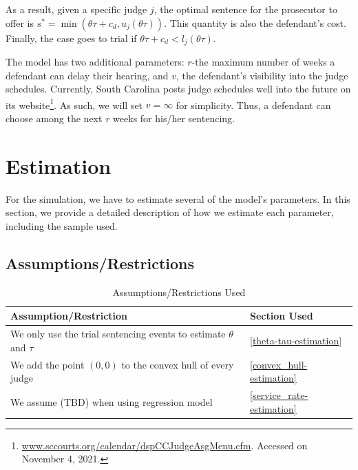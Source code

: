 \documentclass[11pt, oneside]{article}   	%
\theoremstyle{ModifiedStyle}
\begin{document}
  As a result, given a specific judge $j$, the optimal sentence for the prosecutor to offer is $s^* = \min(\theta \tau + c_d,u_j(\theta \tau))$. This quantity is also the defendant's cost. Finally, the case goes to trial if $\theta \tau + c_d < l_j(\theta \tau)$.

	The model has two additional parameters: $r$-the maximum number of weeks a defendant can delay their hearing, and $v$, the defendant's visibility into the judge schedules. Currently, South Carolina posts judge schedules well into the future on its website\footnote{\url{www.sccourts.org/calendar/dspCCJudgeAsgMenu.cfm}. Accessed on November 4, 2021.}. As such, we will set $v=\infty$ for simplicity. Thus, a defendant can choose among the next $r$ weeks for his/her sentencing.

\section{Estimation}
  For the simulation, we have to estimate several of the model's parameters. In this section, we provide a detailed description of how we estimate each parameter, including the sample used.

  \subsection{Assumptions/Restrictions}
    \begin{table}[H]
      \centering
      \caption{Assumptions/Restrictions Used}
      \label{tab:assumptions}
      \begin{tabular}{ll}
      \hline
      \textbf{Assumption/Restriction}                              & \textbf{Section Used}        \\ \hline
      We only use the trial sentencing events to estimate $\theta$ and $\tau$ & \ref{theta-tau-estimation}       \\
      We add the point $(0,0)$ to the convex hull of every judge   & \ref{convex_hull-estimation} \\
      We assume (TBD) when using regression model & \ref{service_rate-estimation} \\ \hline
      \end{tabular}
    \end{table}
\end{document}
